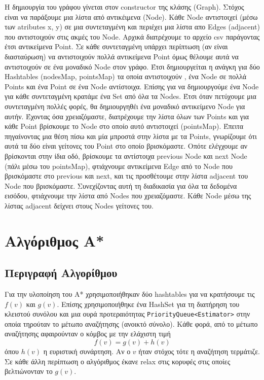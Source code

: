 \documentclass[a4paper,12pt]{article}
\begin{document}
Η δημιουργία του γράφου γίνεται στον constructor της κλάσης (Graph). Στόχος είναι να παράξουμε μια λίστα από αντικέιμενα (Node). Κάθε Node αντιστοιχεί (μέσω των atributes x, y) σε μια συντεταγμένη και περιέχει μια λίστα απο Edges (adjacent) που αντιστοιχούν στις ακμές του Node. Αρχικά διατρέχουμε το αρχείο csv παράγοντας έτσι αντικείμενα Point. Σε κάθε συντεταγμένη υπάρχει περίπτωση (αν είναι διασταύρωση) να αντιστοιχούν πολλά αντικείμενα Point όμως θέλουμε αυτά να αντιστοιχούν σε ένα μοναδικό Node στον γράφο. Έτσι δημιουργείται η ανάγκη για δύο Hashtables (nodesMap, pointsMap) τα οποία αντιστοιχούν , ένα Node σε πολλά Points και ένα Point σε ένα Node αντίστοιχα. Επίσης για να δημιουργούμε ένα Node για κάθε συντεταγμένη κρατάμε ένα Set από όλα τα Nodes. Έτσι όταν πετύχουμε μια συντεταγμένη πολλές φορές, θα δημιουργηθέι ένα μοναδικό αντικείμενο Node για αυτήν. Έχοντας όσα χρειαζόμαστε, διατρέχουμε την λίστα όλων των Points και για κάθε Point βρίσκουμε το Node στο οποίο αυτό αντιστοιχεί (pointsMap). Έπειτα πηγαίνοντας μια θέση πίσω και μία μπροστά στην λίστα με τα Points, γνωρίζουμε ότι αυτά τα δύο είναι γείτονες του Point στο οποίο βρισκόμαστε. Οπότε ελέγχουμε αν βρίσκονται στην ίδια οδό, βρίσκουμε τα αντίστοιχα previous Node και next Node (πάλι μέσω του pointsMap), φτιάχνουμε αντικείμενα Edge από το Node που βρισκόμαστε στο previous και next, και τις προσθέτουμε στην λίστα adjacent του Node που βρισκόμαστε. Συνεχίζοντας αυτή τη διαδικασία για όλα τα δεδομένα εισόδου, φτιάχνουμε την λίστα από Nodes που χρειαζόμαστε. Κάθε Node μέσω της λίστας adjacent δείχνει στους Nodes γείτονες του.

\section{Αλγόριθμος Α*}

\subsection{Περιγραφή Αλγορίθμου}
Για την υλοποίηση του Α* χρησιμοποιήθηκαν δύο hashtables για να κρατήσουμε τις $f(v)$ και $g(v)$. Επίσης χρησιμοποιήθηκε ένα HashSet για τη διατήρηση του κλειστού συνόλου και μια ουρά προτεραιότητας \texttt{PriorityQueue<Estimator>} στην οποία τηρούταν το μέτωπο αναζήτησης (ανοικτό σύνολο). Κάθε φορά, από το μέτωπο αναζήτησης αφαιρούνταν ο κόμβος με την ελάχιστη τιμή $$f(v) = g(v) + h(v)$$ όπου $h(v)$ η ευριστική συνάρτηση. Αν ο $v$ ήταν στόχος τότε η αναζήτηση τερμάτιζε. Σε κάθε άλλη περίπτωση ο αλγόριθμος έκανε relax στις κορυφές στις οποίες βελτιώνονταν το $g(v)$. 
\end{document}
